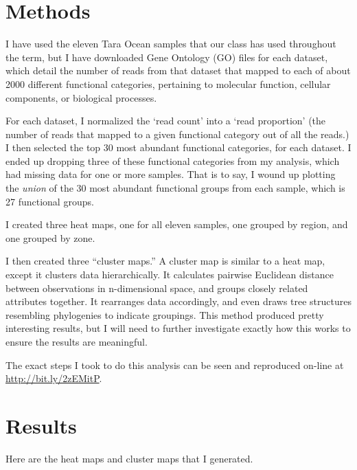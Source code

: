 \documentclass[12pt,a4paper,]{article}
\begin{document}
\section{Methods}\label{methods}

I have used the eleven Tara Ocean samples that our class has used
throughout the term, but I have downloaded Gene Ontology (GO) files for
each dataset, which detail the number of reads from that dataset that
mapped to each of about 2000 different functional categories, pertaining
to molecular function, cellular components, or biological processes.

For each dataset, I normalized the `read count' into a `read proportion'
(the number of reads that mapped to a given functional category out of
all the reads.) I then selected the top 30 most abundant functional
categories, for each dataset. I ended up dropping three of these
functional categories from my analysis, which had missing data for one
or more samples. That is to say, I wound up plotting the \emph{union} of
the 30 most abundant functional groups from each sample, which is 27
functional groups.

I created three heat maps, one for all eleven samples, one grouped by
region, and one grouped by zone.

I then created three ``cluster maps.'' A cluster map is similar to a
heat map, except it clusters data hierarchically. It calculates pairwise
Euclidean distance between observations in n-dimensional space, and
groups closely related attributes together. It rearranges data
accordingly, and even draws tree structures resembling phylogenies to
indicate groupings. This method produced pretty interesting results, but
I will need to further investigate exactly how this works to ensure the
results are meaningful.

The exact steps I took to do this analysis can be seen and reproduced
on-line at \url{http://bit.ly/2zEMitP}.

\section{Results}\label{results}

Here are the heat maps and cluster maps that I generated.
\end{document}
